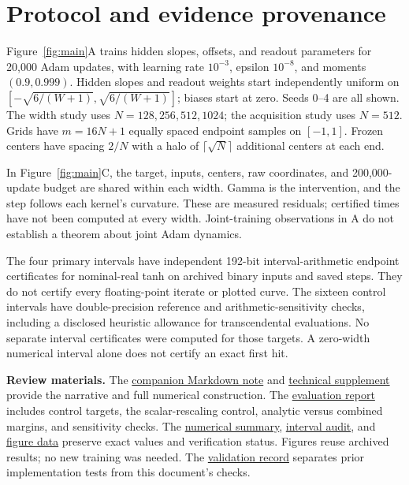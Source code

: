 \documentclass[11pt]{article}
\newcommand{\repo}{https://github.com/samlayton99/precision-mlps/blob/experiment/frozen-gamma-probe}
\newcommand{\evidence}{\repo/results/checkpoint_D_optimizers/expD36_frozen_gamma_probe/full_sweep/refinements/gamma_factorized_kernel}
\theoremstyle{definition}
\begin{document}
\section{Protocol and evidence provenance}\label{app:protocol}
Figure~\ref{fig:main}A trains hidden slopes, offsets, and readout parameters
for 20,000 Adam updates, with learning rate $10^{-3}$, epsilon $10^{-8}$,
and moments $(0.9,0.999)$. Hidden slopes and readout weights start independently
uniform on $[-\sqrt{6/(W+1)},\sqrt{6/(W+1)}]$; biases start at zero.
Seeds 0--4 are all shown. The width study uses $N=128,256,512,1024$;
the acquisition study uses $N=512$. Grids have $m=16N+1$ equally spaced
endpoint samples on $[-1,1]$. Frozen centers have spacing $2/N$ with a halo
of $\lceil\sqrt N\rceil$ additional centers at each end.

In Figure~\ref{fig:main}C, the target, inputs, centers, raw coordinates, and
200,000-update budget are shared within each width. Gamma is the intervention,
and the step follows each kernel's curvature. These are measured residuals;
certified times have not been computed at every width. Joint-training
observations in A do not establish a theorem about joint Adam dynamics.

The four primary intervals have independent 192-bit interval-arithmetic
endpoint certificates for nominal-real tanh on archived binary inputs and
saved steps. They do not certify every floating-point iterate or plotted
curve. The sixteen control intervals have double-precision reference and
arithmetic-sensitivity checks, including a disclosed heuristic allowance for
transcendental evaluations. No separate interval certificates were computed
for those targets. A zero-width numerical interval alone does not certify
an exact first hit.

\textbf{Review materials.}
The \href{\repo/docs/gamma_optimization_paper_note.md}{companion Markdown note}
and \href{\repo/docs/gamma_factorized_readout.md}{technical supplement}
provide the narrative and full numerical construction.
The \href{\evidence/REPORT.md}{evaluation report} includes control targets,
the scalar-rescaling control, analytic versus combined margins, and sensitivity
checks. The \href{\evidence/summary.json}{numerical summary},
\href{\evidence/interval_audit.json}{interval audit}, and
\href{\evidence/review_figure_data.json}{figure data} preserve exact values
and verification status. Figures reuse archived results; no new training was
needed. The \href{\evidence/paper_validation.json}{validation record}
separates prior implementation tests from this document's checks.
\end{document}
